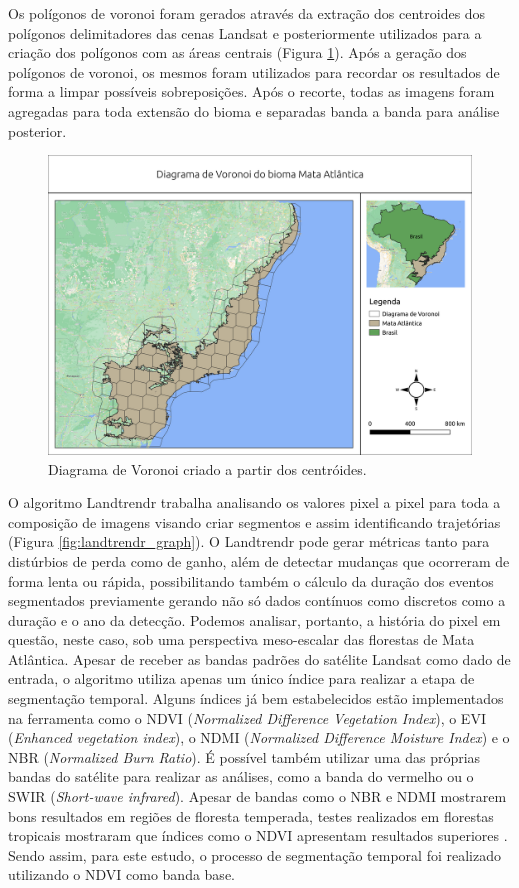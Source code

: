 Os polígonos de voronoi foram gerados através da extração dos centroides dos polígonos delimitadores das cenas Landsat e posteriormente utilizados para a criação dos polígonos com as áreas centrais (Figura \ref{fig:voronoi_ma}). Após a geração dos polígonos de voronoi, os mesmos foram utilizados para recordar os resultados de forma a limpar possíveis sobreposições. Após o recorte, todas as imagens foram agregadas para toda extensão do bioma e separadas banda a banda para análise posterior.

\begin{figure}[H]
    \centering
    \includegraphics[scale=.5]{images/voronoi_mata_atlantica.png}
    \caption{Diagrama de Voronoi criado a partir dos centróides.}
    \label{fig:voronoi_ma}
\end{figure}

O algoritmo Landtrendr trabalha analisando os valores pixel a pixel para toda a composição de imagens visando criar segmentos e assim identificando trajetórias (Figura \ref{fig:landtrendr_graph}). O Landtrendr pode gerar métricas tanto para distúrbios de perda como de ganho, além de detectar mudanças que ocorreram de forma lenta ou rápida, possibilitando também o cálculo da duração dos eventos segmentados previamente gerando não só dados contínuos como discretos como a duração e o ano da detecção. Podemos analisar, portanto, a história do pixel em questão, neste caso, sob uma perspectiva meso-escalar das florestas de Mata Atlântica. Apesar de receber as bandas padrões do satélite Landsat como dado de entrada, o algoritmo utiliza apenas um único índice para realizar a etapa de segmentação temporal. Alguns índices já bem estabelecidos estão implementados na ferramenta como o NDVI (\textit{Normalized Difference Vegetation Index}), o EVI (\textit{Enhanced vegetation index}), o NDMI (\textit{Normalized Difference Moisture Index}) e o NBR (\textit{Normalized Burn Ratio}). É possível também utilizar uma das próprias bandas do satélite para realizar as análises, como a banda do vermelho ou o SWIR (\textit{Short-wave infrared}). Apesar de bandas como o NBR e NDMI mostrarem bons resultados em regiões de floresta temperada, testes realizados em florestas tropicais mostraram que índices como o NDVI apresentam resultados superiores \citep{zebende2019}. Sendo assim, para este estudo, o processo de segmentação temporal foi realizado utilizando o NDVI como banda base.


